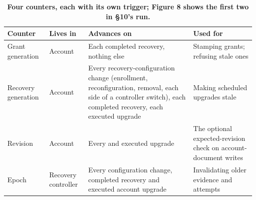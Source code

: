 \begin{table}[tbp]
\centering
\caption{\textbf{Four counters, each with its own trigger; Figure 8 shows the first two in \S{}10's run.} }\label{tab:tab-counters}
\footnotesize\begin{tabularx}{\linewidth}{@{}LLLL@{}}
\toprule
\textbf{Counter} & \textbf{Lives in} & \textbf{Advances on} & \textbf{Used for} \\
\midrule
Grant generation & Account & Each completed recovery, nothing else & Stamping grants; refusing stale ones \\
Recovery generation & Account & Every recovery-configuration change (enrollment, reconfiguration, removal, each side of a controller switch), each completed recovery, each executed upgrade & Making scheduled upgrades stale \\
Revision & Account & Every  and executed upgrade & The optional expected-revision check on account-document writes \\
Epoch & Recovery controller & Every configuration change, completed recovery and executed account upgrade & Invalidating older evidence and attempts \\
\bottomrule
\end{tabularx}
\end{table}
